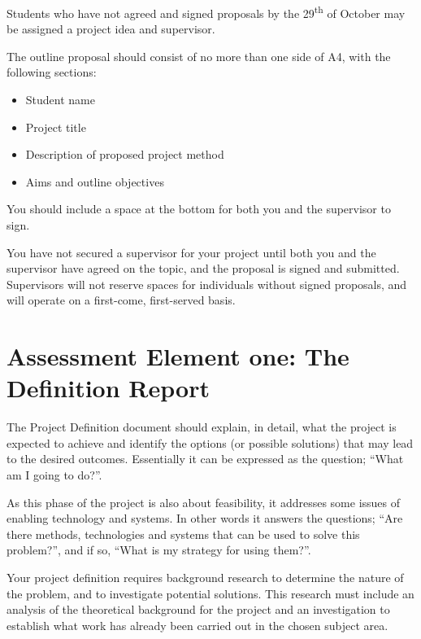 \begin{tcolorbox}
    Students who have not agreed and signed proposals by the 29\textsuperscript{th} of October may be assigned a project idea and supervisor. 
\end{tcolorbox}

The outline proposal should consist of no more than one side of A4, with the following sections:

\begin{itemize}
    \item Student name
    \item Project title
    \item Description of proposed project method
    \item Aims and outline objectives
\end{itemize}

You should include a space at the bottom for both you and the supervisor to sign. 

\begin{tcolorbox}
    You have not secured a supervisor for your project until both you and the supervisor have agreed on the topic, and the proposal is signed and submitted. Supervisors will not reserve spaces for individuals without signed proposals, and will operate on a first-come, first-served basis.
\end{tcolorbox}


\section{Assessment Element one: The Definition Report}

The Project Definition document should explain, in detail, what the project is expected to achieve and identify the options (or possible solutions) that may lead to the desired outcomes. Essentially it can be expressed as the  question; “What am I going to do?”.

As this phase of the project is also about feasibility, it addresses some issues of enabling technology and systems. In other words it answers the questions; “Are there methods, technologies and systems that can be used to solve this problem?”, and if so, “What is my strategy for using them?”.

Your project definition requires background research to determine the nature of the problem, and to investigate potential solutions. This research must include an analysis of the theoretical background for the project and an investigation to establish what work has already been carried out in the chosen subject area.


